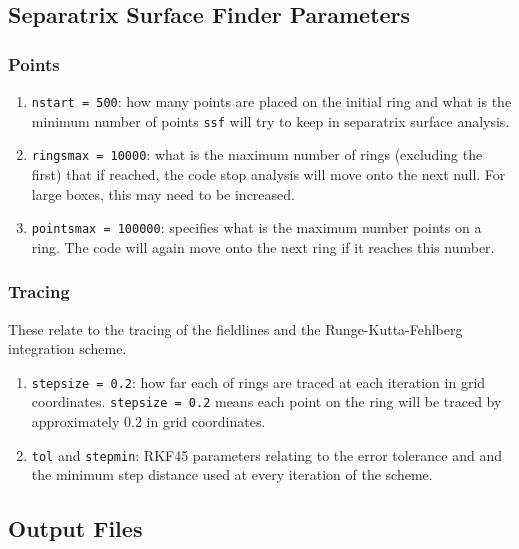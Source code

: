 \documentclass[12pt]{article}
\begin{document}
    \subsection{Separatrix Surface Finder Parameters}

      \subsubsection{Points}
      
      \begin{enumerate}
        \item \texttt{nstart = 500}: how many points are placed on the initial ring and what is the minimum number of points \texttt{ssf} will try to keep in separatrix surface analysis.
        \item \texttt{ringsmax = 10000}: what is the maximum number of rings (excluding the first) that if reached, the code stop analysis will move onto the next null. For large boxes, this may need to be increased.
        \item \texttt{pointsmax = 100000}: specifies what is the maximum number points on a ring. The code will again move onto the next ring if it reaches this number.
      \end{enumerate}

      \subsubsection{Tracing}

      These relate to the tracing of the fieldlines and the Runge-Kutta-Fehlberg integration scheme.

      \begin{enumerate}
        \item \texttt{stepsize = 0.2}: how far each of rings are traced at each iteration in grid coordinates. \texttt{stepsize = 0.2} means each point on the ring will be traced by approximately 0.2 in grid coordinates.
        \item \texttt{tol} and \texttt{stepmin}: RKF45 parameters relating to the error tolerance and and the minimum step distance used at every iteration of the scheme.
      \end{enumerate}
    
    \subsection{Output Files}
  
\end{document}
